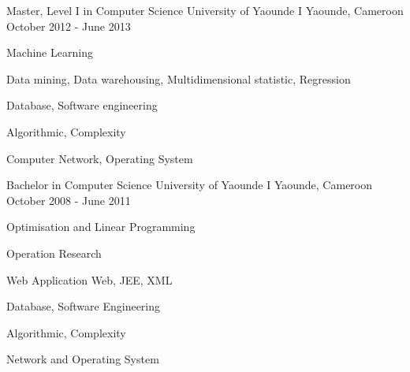 

\begin{cventries}

  \cventry
    {Master, Level I in Computer Science} %
    {University of Yaounde I} %
    {Yaounde, Cameroon} %
    {October 2012 - June 2013} %
    {
      \begin{cvitems} %
        \item {Machine Learning}
        \item {Data mining, Data warehousing, Multidimensional statistic, Regression}
        \item {Database, Software engineering}
        \item {Algorithmic, Complexity}
        \item {Computer Network, Operating System}
      \end{cvitems}
    }

  \cventry
    {Bachelor in Computer Science} %
    {University of Yaounde I} %
    {Yaounde, Cameroon} %
    {October 2008 - June 2011} %
    {
      \begin{cvitems} %
        \item {Optimisation and Linear Programming}
        \item {Operation Research}
        \item {Web Application Web, JEE, XML}
        \item {Database, Software Engineering}
        \item {Algorithmic, Complexity}
        \item {Network and Operating System}
      \end{cvitems}
    }

\end{cventries}
